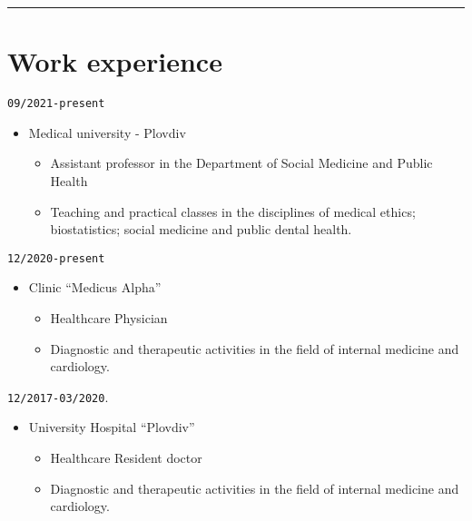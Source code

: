 \documentclass[
  12pt,
  letterpaper,
  DIV=11,
  numbers=noendperiod]{scrartcl}
\providecommand{\tightlist}{%
  \setlength{\itemsep}{0pt}\setlength{\parskip}{0pt}}\usepackage{longtable,booktabs,array}
\begin{document}
\begin{center}\rule{0.5\linewidth}{0.5pt}\end{center}

\section{Work experience}\label{work-experience}

\texttt{09/2021-present}

\begin{itemize}
\tightlist
\item
  Medical university - Plovdiv

  \begin{itemize}
  \tightlist
  \item
    Assistant professor in the Department of Social Medicine and Public
    Health
  \item
    Teaching and practical classes in the disciplines of medical ethics;
    biostatistics; social medicine and public dental health.
  \end{itemize}
\end{itemize}

\texttt{12/2020-present}

\begin{itemize}
\tightlist
\item
  Clinic ``Medicus Alpha''

  \begin{itemize}
  \tightlist
  \item
    Healthcare \textbar{} Physician
  \item
    Diagnostic and therapeutic activities in the field of internal
    medicine and cardiology.
  \end{itemize}
\end{itemize}

\texttt{12/2017-03/2020}.

\begin{itemize}
\tightlist
\item
  University Hospital ``Plovdiv''

  \begin{itemize}
  \tightlist
  \item
    Healthcare \textbar{} Resident doctor
  \item
    Diagnostic and therapeutic activities in the field of internal
    medicine and cardiology.
  \end{itemize}
\end{itemize}
\end{document}
